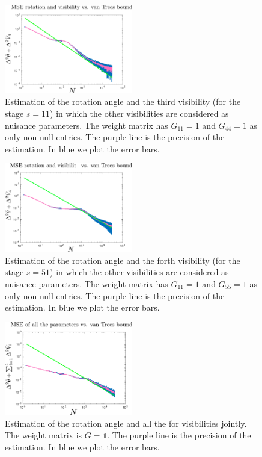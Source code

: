 \documentclass[aps, pra, 10pt, twocolumn, superscriptaddress,floatfix]{revtex4-1}
\def \id {\mathds{1}}
\begin{document}
%
\begin{figure}[!t]
	\begin{center}
		\includegraphics[width=0.5\textwidth]{thetaV3.pdf}
	\end{center}
	\caption{Estimation of the rotation angle and the third visibility (for the stage $s=11$) in which the other visibilities are considered as nuisance parameters. The weight matrix has $G_{11} = 1$ and $G_{44} = 1$ as only non-null entries. The purple line is the precision of the estimation. In blue we plot the error bars.}
	\label{fig:thetaV3}
\end{figure}
%
\begin{figure}[!t]
	\begin{center}
		\includegraphics[width=0.5\textwidth]{thetaV4.pdf}
	\end{center}
	\caption{Estimation of the rotation angle and the forth visibility (for the stage $s=51$) in which the other visibilities are considered as nuisance parameters. The weight matrix has $G_{11} = 1$ and $G_{55} = 1$ as only non-null entries. The purple line is the precision of the estimation. In blue we plot the error bars.}
	\label{fig:thetaV4}
\end{figure}
%
\begin{figure}[!t]
	\begin{center}
		\includegraphics[width=0.5\textwidth]{multiparameter.pdf}
	\end{center}
	\caption{Estimation of the rotation angle and all the for visibilities jointly. The weight matrix is $G = \id$. The purple line is the precision of the estimation. In blue we plot the error bars.}
	\label{fig:allParameters}
\end{figure}
\end{document}
